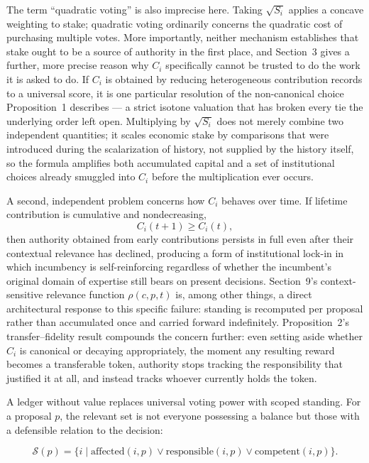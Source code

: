 \documentclass[11pt,oneside]{article}
\theoremstyle{plain}
\theoremstyle{definition}
\begin{document}
The term \enquote{quadratic voting} is also imprecise here. Taking $\sqrt{S_i}$ applies a concave weighting to stake; quadratic voting ordinarily concerns the quadratic cost of purchasing multiple votes. More importantly, neither mechanism establishes that stake ought to be a source of authority in the first place, and Section~3 gives a further, more precise reason why $C_i$ specifically cannot be trusted to do the work it is asked to do. If $C_i$ is obtained by reducing heterogeneous contribution records to a universal score, it is one particular resolution of the non-canonical choice Proposition~1 describes --- a strict isotone valuation that has broken every tie the underlying order left open. Multiplying by $\sqrt{S_i}$ does not merely combine two independent quantities; it scales economic stake by comparisons that were introduced during the scalarization of history, not supplied by the history itself, so the formula amplifies both accumulated capital and a set of institutional choices already smuggled into $C_i$ before the multiplication ever occurs.

A second, independent problem concerns how $C_i$ behaves over time. If lifetime contribution is cumulative and nondecreasing,
\begin{equation}
C_i(t+1) \geq C_i(t),
\end{equation}
then authority obtained from early contributions persists in full even after their contextual relevance has declined, producing a form of institutional lock-in in which incumbency is self-reinforcing regardless of whether the incumbent's original domain of expertise still bears on present decisions. Section~9's context-sensitive relevance function $\rho(c,p,t)$ is, among other things, a direct architectural response to this specific failure: standing is recomputed per proposal rather than accumulated once and carried forward indefinitely. Proposition~2's transfer--fidelity result compounds the concern further: even setting aside whether $C_i$ is canonical or decaying appropriately, the moment any resulting reward becomes a transferable token, authority stops tracking the responsibility that justified it at all, and instead tracks whoever currently holds the token.

A ledger without value replaces universal voting power with scoped standing. For a proposal $p$, the relevant set is not everyone possessing a balance but those with a defensible relation to the decision:

\begin{equation}
\mathcal{S}(p)=\{i \mid \mathrm{affected}(i,p) \lor \mathrm{responsible}(i,p)
\lor \mathrm{competent}(i,p)\}.
\end{equation}
\end{document}
